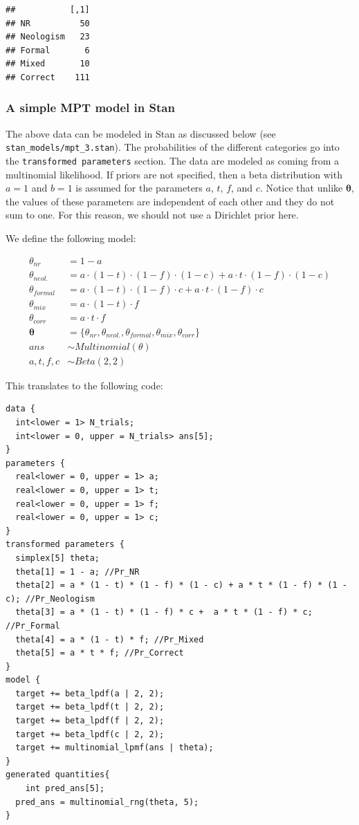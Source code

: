 \documentclass[12pt,]{krantz}
\theoremstyle{definition}
\theoremstyle{definition}
\theoremstyle{definition}
\theoremstyle{remark}
\begin{document}
\begin{verbatim}
##           [,1]
## NR          50
## Neologism   23
## Formal       6
## Mixed       10
## Correct    111
\end{verbatim}

\hypertarget{sec:MPT-s}{%
\subsubsection{A simple MPT model in Stan}\label{sec:MPT-s}}

The above data can be modeled in Stan as discussed below (see \texttt{stan\_models/mpt\_3.stan}). The probabilities of the different categories go into the \texttt{transformed\ parameters} section. The data are modeled as coming from a multinomial likelihood. If priors are not specified, then a beta distribution with \(a=1\) and \(b=1\) is assumed for the parameters \(a\), \(t\), \(f\), and \(c\). Notice that unlike \(\boldsymbol{\theta}\), the values of these parameters are independent of each other and they do not sum to one. For this reason, we should not use a Dirichlet prior here.

We define the following model:

\begin{equation}
\begin{aligned}
\theta_{nr} &= 1-a \\
\theta_{neol.} &= a \cdot (1-t) \cdot (1-f) \cdot (1-c) +  a \cdot t \cdot (1-f) \cdot (1-c)\\
\theta_{formal} &= a \cdot (1-t) \cdot (1-f) \cdot c +  a \cdot t \cdot (1-f) \cdot c\\
\theta_{mix} &= a \cdot (1-t) \cdot f\\
\theta_{corr} &= a \cdot t \cdot f\\
\boldsymbol{\theta} &= \{\theta_{nr}, \theta_{neol.}, \theta_{formal}, \theta_{mix}, \theta_{corr}\}\\
ans &\sim Multinomial(\theta)\\
a,t,f,c &\sim Beta(2, 2)
\end{aligned}
\end{equation}

This translates to the following code:

\begin{verbatim}
data { 
  int<lower = 1> N_trials;
  int<lower = 0, upper = N_trials> ans[5];
}
parameters {
  real<lower = 0, upper = 1> a;
  real<lower = 0, upper = 1> t;
  real<lower = 0, upper = 1> f;
  real<lower = 0, upper = 1> c;
} 
transformed parameters {
  simplex[5] theta;
  theta[1] = 1 - a; //Pr_NR
  theta[2] = a * (1 - t) * (1 - f) * (1 - c) + a * t * (1 - f) * (1 - c); //Pr_Neologism
  theta[3] = a * (1 - t) * (1 - f) * c +  a * t * (1 - f) * c;  //Pr_Formal
  theta[4] = a * (1 - t) * f; //Pr_Mixed
  theta[5] = a * t * f; //Pr_Correct
}
model {
  target += beta_lpdf(a | 2, 2);
  target += beta_lpdf(t | 2, 2);
  target += beta_lpdf(f | 2, 2);
  target += beta_lpdf(c | 2, 2);
  target += multinomial_lpmf(ans | theta);
}
generated quantities{
    int pred_ans[5];
  pred_ans = multinomial_rng(theta, 5);
}
\end{verbatim}
\end{document}
